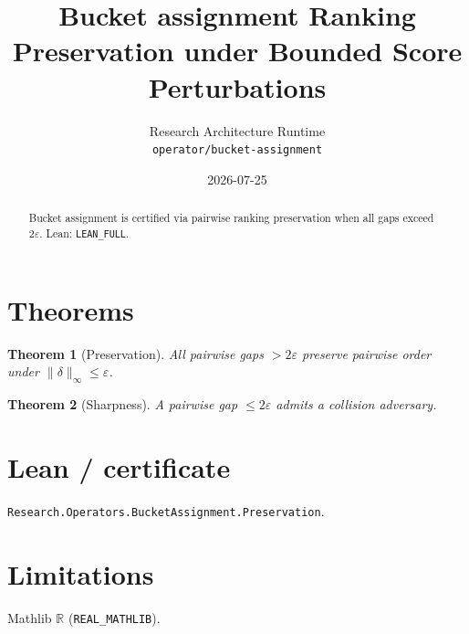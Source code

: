 \documentclass[11pt]{article}
\title{Bucket assignment Ranking Preservation under Bounded Score Perturbations}
\author{Research Architecture Runtime \\ \texttt{operator/bucket-assignment}}
\date{2026-07-25}
\newtheorem{theorem}{Theorem}
\begin{document}
\maketitle
\begin{abstract}
Bucket assignment is certified via pairwise ranking preservation when all gaps exceed $2\varepsilon$. Lean: \texttt{LEAN\_FULL}.
\end{abstract}
\section{Theorems}
\begin{theorem}[Preservation]
All pairwise gaps $>2\varepsilon$ preserve pairwise order under $\|\delta\|_\infty\le\varepsilon$.
\end{theorem}
\begin{theorem}[Sharpness]
A pairwise gap $\le 2\varepsilon$ admits a collision adversary.
\end{theorem}
\section{Lean / certificate}
\texttt{Research.Operators.BucketAssignment.Preservation}.
\section{Limitations}
Mathlib $\mathbb{R}$ (\texttt{REAL\_MATHLIB}).
\end{document}
